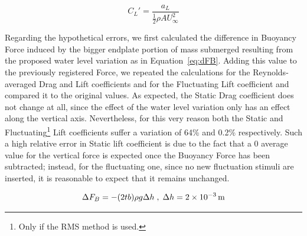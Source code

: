 \documentclass[12pt]{article}
\begin{document}
        \begin{equation} \label{eq:lift_p}
                C_L' = \frac{a_L}{\frac{1}{2} \rho A U_\infty^2}
        \end{equation}

        Regarding the hypothetical errors, we first calculated the difference in Buoyancy Force induced by the bigger endplate portion of mass submerged resulting from the proposed water level variation as in Equation~\ref{eq:dFB}. Adding this value to the previously registered Force, we repeated the calculations for the Reynolds-averaged Drag and Lift coefficients and for the Fluctuating Lift coefficient and compared it to the original values. As expected, the Static Drag coefficient does not change at all, since the effect of the water level variation only has an effect along the vertical axis. Nevertheless, for this very reason both the Static and Fluctuating\footnote{Only if the RMS method is used.} Lift coefficients suffer a variation of 64\% and 0.2\% respectively. Such a high relative error in Static lift coefficient is due to the fact that a 0 average value for the vertical force is expected once the Buoyancy Force has been subtracted; instead, for the fluctuating one, since no new fluctuation stimuli are inserted, it is reasonable to expect that it remains unchanged.

        \begin{equation} \label{eq:dFB}
                \Delta F_B = - (2 t b) \rho g \Delta h \; , \; \Delta h = \SI{2E-3}{\metre}
        \end{equation}



\end{document}
